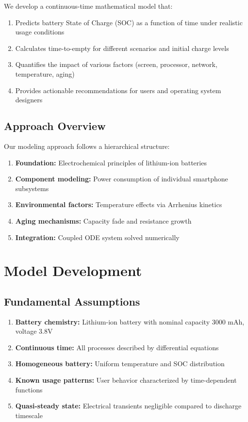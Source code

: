\documentclass[12pt]{article}
\begin{document}
We develop a continuous-time mathematical model that:
\begin{enumerate}
\item Predicts battery State of Charge (SOC) as a function of time under realistic usage conditions
\item Calculates time-to-empty for different scenarios and initial charge levels
\item Quantifies the impact of various factors (screen, processor, network, temperature, aging)
\item Provides actionable recommendations for users and operating system designers
\end{enumerate}

\subsection{Approach Overview}

Our modeling approach follows a hierarchical structure:
\begin{enumerate}
\item \textbf{Foundation:} Electrochemical principles of lithium-ion batteries
\item \textbf{Component modeling:} Power consumption of individual smartphone subsystems
\item \textbf{Environmental factors:} Temperature effects via Arrhenius kinetics
\item \textbf{Aging mechanisms:} Capacity fade and resistance growth
\item \textbf{Integration:} Coupled ODE system solved numerically
\end{enumerate}

\section{Model Development}

\subsection{Fundamental Assumptions}

\begin{enumerate}
\item \textbf{Battery chemistry:} Lithium-ion battery with nominal capacity 3000 mAh, voltage 3.8V
\item \textbf{Continuous time:} All processes described by differential equations
\item \textbf{Homogeneous battery:} Uniform temperature and SOC distribution
\item \textbf{Known usage patterns:} User behavior characterized by time-dependent functions
\item \textbf{Quasi-steady state:} Electrical transients negligible compared to discharge timescale
\end{enumerate}
\end{document}
